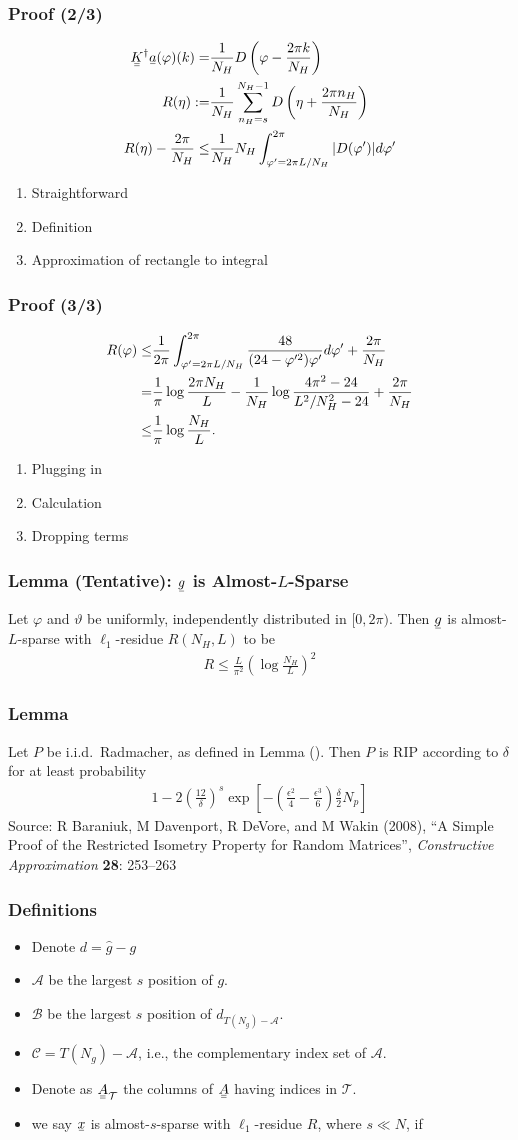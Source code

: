 \documentclass{beamer}
\newcommand{\Disp}[1]{\begin{align} #1 \end{align}}
\renewcommand{\H}{\dagger}
\newcommand{\NT}{\notag}
\renewcommand{\d}{\delta}
\newcommand{\f}{\varphi}
\renewcommand{\th}{\vartheta}
\newcommand{\I}{\item}
\newcommand{\MC}[1]{\mathcal{#1}}
\newcommand{\F}[1]{\frac{#1}}
\newcommand{\V}[1]{\stackunder[1.2pt]{$#1$}{\rule{.9ex}{.075ex}}}
\newcommand{\M}[1]{\V{\V{#1}}}
\begin{document}
\begin{frame}
\frametitle{Proof (2/3)}
\Disp{
\M{K}^\H \V{a}(\f) (k)
=&\F{1}{N_H} D \left( \f -\F{2 \pi k} {N_H} \right) \\
R(\eta)
:=&\F{1}{N_H} \sum_{n_H =s}^{N_H -1} D \left( \eta +\F{2 \pi n_H} {N_H} \right) \\
R(\eta) -\F{2\pi} {N_H}
\leq &\F{1}{N_H} N_H \int_{\f'=2\pi L/N_H}^{2\pi} |D(\f')| d \f'
}
\begin{enumerate}
\I Straightforward
\I Definition
\I Approximation of rectangle to integral
\end{enumerate}
\end{frame}

\begin{frame}
\frametitle{Proof (3/3)}
\Disp{
R(\f)
\leq &\F{1}{2\pi} \int_{\f'=2\pi L/N_H}^{2\pi} \F{48}{(24 -\f'^2) \f'} d \f'
+\F{2\pi} {N_H} \NT \\
=&\F{1}{\pi} \log \F{2\pi N_H}{L}
-\F{1}{N_H} \log \F{4\pi^2 -24} {L^2/N_H^2 -24}
+\F{2\pi} {N_H} \\
\leq &\F{1}{\pi} \log \F{N_H}{L}.
}
\begin{enumerate}
\I Plugging in
\I Calculation
\I Dropping terms
\end{enumerate}
\end{frame}

\begin{frame}
\frametitle{Lemma (Tentative): \(\V{g}\) is Almost-\(L\)-Sparse}
Let \(\f\) and \(\th\) be uniformly, independently distributed in \([0,2\pi)\).
Then \(\V{g}\) is almost-\(L\)-sparse with \(\ell_1\)-residue \(R(N_H, L)\) to be
\Disp{
R
\leq \F{L}{\pi^2} \left( \log \F{N_H}{L} \right)^2
}
\end{frame}



\begin{frame}
\frametitle{Lemma}
Let \(P\) be i.i.d.\ Radmacher, as defined in Lemma ().
Then \(P\) is RIP according to \(\d\) for at least probability
\Disp{
1 -2 \left( \F{12}{\d} \right)^s \exp \left[ - \left( \F{\epsilon^2}{4} -\F{\epsilon^3}{6} \right) \F{\d}{2} N_p \right]
}
{\small Source: R Baraniuk, M Davenport, R DeVore, and M Wakin (2008), ``A Simple Proof of the Restricted Isometry Property for Random Matrices'', \textit{Constructive Approximation} \textbf{28}: 253–263 }
\end{frame}

\begin{frame}
\frametitle{Definitions}
\begin{itemize}
\I Denote \(d =\hat{g} -g\)
\I \(\MC{A}\) be the largest \(s\) position of \(g\).
\I \(\MC{B}\) be the largest \(s\) position of \(d_{T(N_g) -\MC{A}}\).
\I \(\MC{C} =T(N_g) -\MC{A}\), i.e., the complementary index set of \(\MC{A}\).
\I Denote as \(\M{A}_{\MC{T}}\) the columns of \(\M{A}\) having indices in \(\MC{T}\).
\I we say \(\V{x}\) is almost-\(s\)-sparse with \(\ell_1\)-residue \(R\), where \(s \ll N\), if
\end{itemize}
\end{frame}
\end{document}
